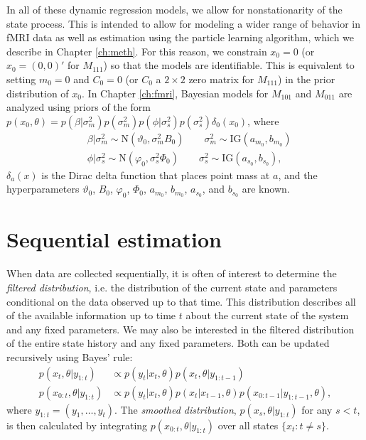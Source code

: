 In all of these dynamic regression models, we allow for nonstationarity of the state process. This is intended to allow for modeling a wider range of behavior in fMRI data as well as estimation using the particle learning algorithm, which we describe in Chapter \ref{ch:meth}. For this reason, we constrain $x_0 = 0$ (or $x_0 = (0,0)'$ for $M_{111}$) so that the models are identifiable. This is equivalent to setting $m_0 = 0$ and $C_0 = 0$ (or $C_0$ a $2 \times 2$ zero matrix for $M_{111}$) in the prior distribution of $x_0$. In Chapter \ref{ch:fmri}, Bayesian models for $M_{101}$ and $M_{011}$ are analyzed using priors of the form $p(x_0, \theta) = p(\beta|\sigma^2_m)p(\sigma^2_m)p(\phi|\sigma^2_s)p(\sigma^2_s)\delta_0(x_0)$, where
\begin{align}
&\beta|\sigma^2_m \sim \mbox{N}(\vartheta_0, \sigma^2_mB_0) \qquad \sigma^2_m \sim \mbox{IG}(a_{m_0}, b_{m_0}) \label{eqn:dynreg:prior1} \\
&\phi|\sigma^2_s \sim \mbox{N}(\varphi_0, \sigma^2_s\Phi_0) \qquad \sigma^2_s \sim \mbox{IG}(a_{s_0}, b_{s_0}), \label{eqn:dynreg:prior2}
\end{align}
$\delta_a(x)$ is the Dirac delta function that places point mass at $a$, and the hyperparameters $\vartheta_0$, $B_0$, $\varphi_0$, $\Phi_0$, $a_{m_0}$, $b_{m_0}$, $a_{s_0}$, and $b_{s_0}$ are known.

\section{Sequential estimation \label{sec:sequential}}

When data are collected sequentially, it is often of interest to determine the \emph{filtered distribution}, i.e. the distribution of the current state and parameters conditional on the data observed up to that time. This distribution describes all of the available information up to time $t$ about the current state of the system and any fixed parameters. We may also be interested in the filtered distribution of the entire state history and any fixed parameters. Both can be updated recursively using Bayes' rule:
\begin{align}
p(x_t,\theta| y_{1:t}) &\propto p(y_t|x_t,\theta)p(x_t,\theta|y_{1:t-1}) \label{eqn:filtered} \\
p(x_{0:t},\theta|y_{1:t}) &\propto p(y_t|x_t,\theta)p(x_t|x_{t-1},\theta)p(x_{0:t-1}|y_{1:t-1},\theta), \label{eqn:filtered:hist}
\end{align}
where $y_{1:t} = (y_1,\ldots,y_t)$. The \emph{smoothed distribution}, $p(x_s,\theta|y_{1:t})$ for any $s < t$, is then calculated by integrating $p(x_{0:t},\theta|y_{1:t})$ over all states $\{x_t: t \ne s\}$.

